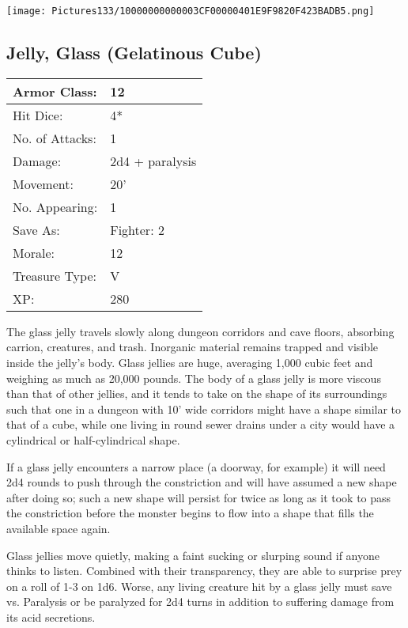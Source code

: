 \documentclass[a4paper,twoside,openany,10pt]{book}
\begin{document}
\begin{multicols}{2}
\begin{center} \texttt{[image: Pictures133/10000000000003CF00000401E9F9820F423BADB5.png]} \end{center}

\subsection*{Jelly, Glass (Gelatinous Cube)}\label{jelly-glass-gelatinous-cube}

\begin{tabularx}{0.50\textwidth}{@{}lX@{}}
Armor Class: & 12 \\\hline
Hit Dice: & 4* \\\hline
No. of Attacks: & 1 \\\hline
Damage: & 2d4 + paralysis \\\hline
Movement: & 20' \\\hline
No. Appearing: & 1 \\\hline
Save As: & Fighter: 2 \\\hline
Morale: & 12 \\\hline
Treasure Type: & V \\\hline
XP: & 280 \\\hline
\end{tabularx}

The
glass jelly travels slowly along dungeon corridors and cave floors, absorbing carrion, creatures, and trash. Inorganic material remains trapped and visible inside the jelly's body. Glass jellies are huge, averaging 1,000 cubic feet and weighing as much as 20,000 pounds. The body of a glass jelly is more viscous than that of other jellies, and it tends to take on the shape of its surroundings such that one in a dungeon with 10' wide corridors might have a shape similar to that of a cube, while one living in round sewer drains under a city would have a cylindrical or half-cylindrical shape.

If a glass jelly encounters a narrow place (a doorway, for example) it will need 2d4 rounds to push through the constriction and will have assumed a new shape after doing so; such a new shape will persist for twice as long as it took to pass the constriction before the monster begins to flow into a shape that fills the available space again. 

Glass jellies move quietly, making a faint sucking or slurping sound if anyone thinks to listen. Combined with their transparency, they are able to surprise prey on a roll of 1-3 on 1d6. Worse, any living creature hit by a glass jelly must save vs. Paralysis or be paralyzed for 2d4 turns in addition to suffering damage from its acid secretions.


\end{multicols}
\end{document}
